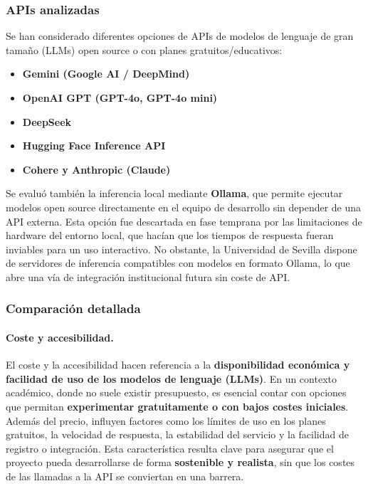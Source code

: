 \subsubsection{APIs analizadas}

Se han considerado diferentes opciones de APIs de modelos de lenguaje de gran tamaño (LLMs) open source o con planes gratuitos/educativos:

\begin{itemize}
    \item \textbf{Gemini (Google AI / DeepMind)}~\cite{geminidocs}
    \item \textbf{OpenAI GPT (GPT-4o, GPT-4o mini)}~\cite{openaiPlatform}
    \item \textbf{DeepSeek}~\cite{deepseekDocs}
    \item \textbf{Hugging Face Inference API}~\cite{huggingfaceInference}
    \item \textbf{Cohere y Anthropic (Claude)}~\cite{anthropicClaude}
\end{itemize}

Se evaluó también la inferencia local mediante \textbf{Ollama}, que permite ejecutar modelos open source directamente en el equipo de desarrollo sin depender de una API externa. Esta opción fue descartada en fase temprana por las limitaciones de hardware del entorno local, que hacían que los tiempos de respuesta fueran inviables para un uso interactivo. No obstante, la Universidad de Sevilla dispone de servidores de inferencia compatibles con modelos en formato Ollama, lo que abre una vía de integración institucional futura sin coste de API.

\subsubsection{Comparación detallada}

\paragraph{Coste y accesibilidad.}

El coste y la accesibilidad hacen referencia a la \textbf{disponibilidad económica y facilidad de uso de los modelos de lenguaje (LLMs)}. En un contexto académico, donde no suele existir presupuesto, es esencial contar con opciones que permitan \textbf{experimentar gratuitamente o con bajos costes iniciales}. Además del precio, influyen factores como los límites de uso en los planes gratuitos, la velocidad de respuesta, la estabilidad del servicio y la facilidad de registro o integración. Esta característica resulta clave para asegurar que el proyecto pueda desarrollarse de forma \textbf{sostenible y realista}, sin que los costes de las llamadas a la API se conviertan en una barrera.


